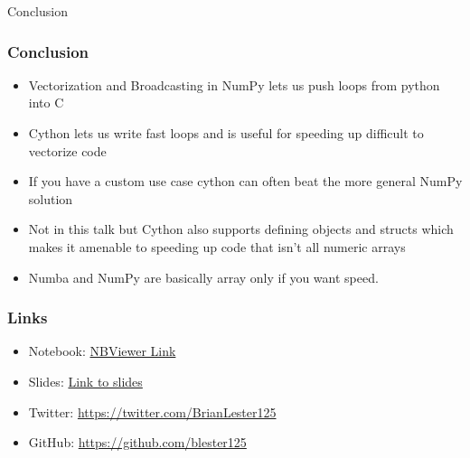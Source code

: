 \documentclass{beamer}
\theoremstyle{case}
\begin{document}
\begin{section}{Conclusion}

\begin{frame}
    \frametitle{Conclusion}
    \begin{itemize}
        \item Vectorization and Broadcasting in NumPy lets us push loops from python into C
        \item Cython lets us write fast loops and is useful for speeding up difficult to vectorize code
        \item If you have a custom use case cython can often beat the more general NumPy solution
    \end{itemize}
    \begin{itemize}
        \item Not in this talk but Cython also supports defining objects and structs which makes it amenable to speeding up code that isn't all numeric arrays
        \item Numba and NumPy are basically array only if you want speed.
    \end{itemize}
\end{frame}

\begin{frame}
    \frametitle{Links}
    \begin{itemize}
        \item Notebook: \href{https://www.google.com}{NBViewer Link}
        \item Slides: \href{https://www.google.com}{Link to slides}
        \item Twitter: \href{https://twitter.com/BrianLester125}{https://twitter.com/BrianLester125}
        \item GitHub: \href{https://github.com/blester125}{https://github.com/blester125}
    \end{itemize}
\end{frame}

\end{section} %
\end{document}
